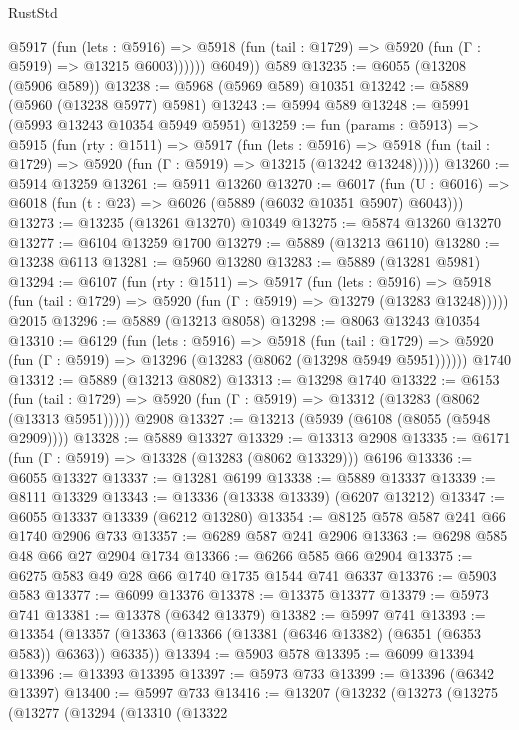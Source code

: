 \begin{lexlean}{RustStd}
\begin{coremodule}
            @5917
              (fun (lets : @5916) =>
              @5918 (fun (tail : @1729) => @5920 (fun (Γ : @5919) => @13215 @6003))))))
        @6049))
    @589
@13235 := @6055 (@13208 (@5906 @589))
@13238 := @5968 (@5969 @589) @10351
@13242 := @5889 (@5960 (@13238 @5977) @5981)
@13243 := @5994 @589
@13248 := @5991 (@5993 @13243 @10354 @5949 @5951)
@13259 := fun (params : @5913) =>
  @5915
    (fun (rty : @1511) =>
    @5917
      (fun (lets : @5916) =>
      @5918 (fun (tail : @1729) => @5920 (fun (Γ : @5919) => @13215 (@13242 @13248)))))
@13260 := @5914 @13259
@13261 := @5911 @13260
@13270 := @6017
    (fun (U : @6016) => @6018 (fun (t : @23) => @6026 (@5889 (@6032 @10351 @5907) @6043)))
@13273 := @13235 (@13261 @13270) @10349
@13275 := @5874 @13260 @13270
@13277 := @6104 @13259 @1700
@13279 := @5889 (@13213 @6110)
@13280 := @13238 @6113
@13281 := @5960 @13280
@13283 := @5889 (@13281 @5981)
@13294 := @6107
    (fun (rty : @1511) =>
    @5917
      (fun (lets : @5916) =>
      @5918 (fun (tail : @1729) => @5920 (fun (Γ : @5919) => @13279 (@13283 @13248)))))
    @2015
@13296 := @5889 (@13213 @8058)
@13298 := @8063 @13243 @10354
@13310 := @6129
    (fun (lets : @5916) =>
    @5918
      (fun (tail : @1729) =>
      @5920 (fun (Γ : @5919) => @13296 (@13283 (@8062 (@13298 @5949 @5951))))))
    @1740
@13312 := @5889 (@13213 @8082)
@13313 := @13298 @1740
@13322 := @6153
    (fun (tail : @1729) => @5920 (fun (Γ : @5919) => @13312 (@13283 (@8062 (@13313 @5951)))))
    @2908
@13327 := @13213 (@5939 (@6108 (@8055 (@5948 @2909))))
@13328 := @5889 @13327
@13329 := @13313 @2908
@13335 := @6171 (fun (Γ : @5919) => @13328 (@13283 (@8062 @13329))) @6196
@13336 := @6055 @13327
@13337 := @13281 @6199
@13338 := @5889 @13337
@13339 := @8111 @13329
@13343 := @13336 (@13338 @13339) (@6207 @13212)
@13347 := @6055 @13337 @13339 (@6212 @13280)
@13354 := @8125 @578 @587 @241 @66 @1740 @2906 @733
@13357 := @6289 @587 @241 @2906
@13363 := @6298 @585 @48 @66 @27 @2904 @1734
@13366 := @6266 @585 @66 @2904
@13375 := @6275 @583 @49 @28 @66 @1740 @1735 @1544 @741 @6337
@13376 := @5903 @583
@13377 := @6099 @13376
@13378 := @13375 @13377
@13379 := @5973 @741
@13381 := @13378 (@6342 @13379)
@13382 := @5997 @741
@13393 := @13354 (@13357 (@13363 (@13366 (@13381 (@6346 @13382) (@6351 (@6353 @583)) @6363)) @6335))
@13394 := @5903 @578
@13395 := @6099 @13394
@13396 := @13393 @13395
@13397 := @5973 @733
@13399 := @13396 (@6342 @13397)
@13400 := @5997 @733
@13416 := @13207
    (@13232
      (@13273
        (@13275
          (@13277
            (@13294
              (@13310
                (@13322

\end{coremodule}
\end{lexlean}
